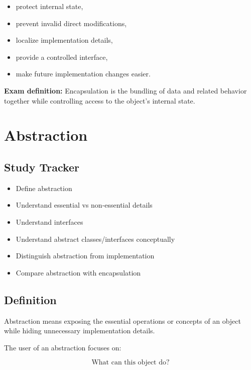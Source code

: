 \documentclass[11pt,a4paper]{article}
\newcommand{\checkitem}{$\square$}
\begin{document}
\begin{itemize}
    \item protect internal state,
    \item prevent invalid direct modifications,
    \item localize implementation details,
    \item provide a controlled interface,
    \item make future implementation changes easier.
\end{itemize}

\begin{exambox}
\textbf{Exam definition:} Encapsulation is the bundling of data and related
behavior together while controlling access to the object's internal state.
\end{exambox}

\section{Abstraction}

\subsection{Study Tracker}

\begin{itemize}[label=\checkitem]
    \item Define abstraction
    \item Understand essential vs non-essential details
    \item Understand interfaces
    \item Understand abstract classes/interfaces conceptually
    \item Distinguish abstraction from implementation
    \item Compare abstraction with encapsulation
\end{itemize}

\subsection{Definition}

Abstraction means exposing the essential operations or concepts of an object
while hiding unnecessary implementation details.

The user of an abstraction focuses on:

\[
\boxed{\text{What can this object do?}}
\]
\end{document}
